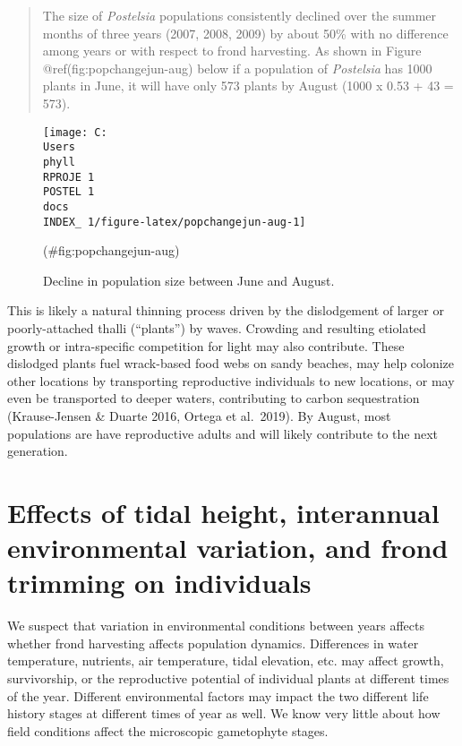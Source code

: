 \documentclass[
]{article}
\begin{document}
\begin{quote}
The size of \emph{Postelsia} populations consistently declined over the summer months of three years (2007, 2008, 2009) by about 50\% with no difference among years or with respect to frond harvesting. As shown in Figure @ref(fig:popchangejun-aug) below if a population of \emph{Postelsia} has 1000 plants in June, it will have only 573 plants by August (1000 x 0.53 + 43 = 573).
\end{quote}

\begin{figure}

\texttt{[image: C:\\Users\\phyll\\RPROJE~1\\POSTEL~1\\docs\\INDEX\_~1/figure-latex/popchangejun-aug-1]} \hfill{}

\caption{Decline in population size between June and August.}(\#fig:popchangejun-aug)
\end{figure}

This is likely a natural thinning process driven by the dislodgement of larger or poorly-attached thalli (``plants'') by waves. Crowding and resulting etiolated growth or intra-specific competition for light may also contribute. These dislodged plants fuel wrack-based food webs on sandy beaches, may help colonize other locations by transporting reproductive individuals to new locations, or may even be transported to deeper waters, contributing to carbon sequestration (Krause-Jensen \& Duarte 2016, Ortega et al.~2019). By August, most populations are have reproductive adults and will likely contribute to the next generation.

\newpage

\hypertarget{effects-of-tidal-height-interannual-environmental-variation-and-frond-trimming-on-individuals}{%
\section{Effects of tidal height, interannual environmental variation, and frond trimming on individuals}\label{effects-of-tidal-height-interannual-environmental-variation-and-frond-trimming-on-individuals}}

We suspect that variation in environmental conditions between years affects whether frond harvesting affects population dynamics. Differences in water temperature, nutrients, air temperature, tidal elevation, etc. may affect growth, survivorship, or the reproductive potential of individual plants at different times of the year. Different environmental factors may impact the two different life history stages at different times of year as well. We know very little about how field conditions affect the microscopic gametophyte stages.
\end{document}
